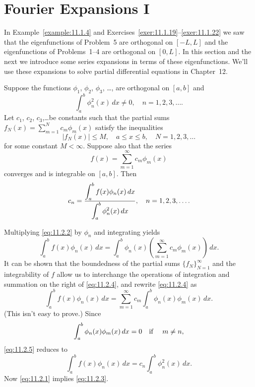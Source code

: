\section{Fourier Expansions I}

\noindent
In Example~\ref{example:11.1.4} and
Exercises~\ref{exer:11.1.19}--\ref{exer:11.1.22} we saw that
the eigenfunctions of Problem~5 are orthogonal on $[-L,L]$ and the eigenfunctions of Problems~1--4
are orthogonal on $[0,L]$. In this section and the next we introduce some series expansions in terms
of these eigenfunctions. We'll use these expansions to solve partial differential equations in
Chapter~12.

\begin{theorem}
  \color{blue}
  \label{thmtype:11.2.1} Suppose the functions $\phi_{1}$, $\phi_{2}$, $\phi_{3}$, \dots, are
  orthogonal on $[a,b]$ and
  \begin{equation}
    \label{eq:11.2.1}\int_{a}^{b}\phi_{n}^{2}(x)\,dx\ne0,\quad n=1,2,3,\dots.
  \end{equation}
  Let $c_{1}$, $c_{2}$, $c_{3}$,\dots be constants such that the partial sums
  $f_{N}(x)=\sum_{m=1}^{N}c_{m}\phi_{m}(x)$ satisfy the inequalities
  \[
    |f_{N}(x)|\le M,\quad a\le x\le b,\quad N=1,2,3,\dots
  \]
  for some constant $M<\infty$. Suppose also that the series
  \begin{equation}
    \label{eq:11.2.2}f(x)=\sum_{m=1}^{\infty}c_{m}\phi_{m}(x)
  \end{equation}
  converges and is integrable on $[a,b]$. Then
  \begin{equation}
    \label{eq:11.2.3}c_{n}=\frac{\displaystyle\int_{a}^{b}f(x)\phi_{n}(x)\,dx}{\displaystyle\int_{a}^{b}\phi_{n}^{2}(x)\,dx},\quad n=1,2,3,\dots.
  \end{equation}
\end{theorem}

\proof Multiplying \eqref{eq:11.2.2} by $\phi_{n}$ and integrating yields
\begin{equation}
  \label{eq:11.2.4}\int_{a}^{b}f(x)\phi_{n}(x)\,dx=\int_{a}^{b}\phi_{n}(x)\left(\sum_{m=1}^{\infty}c_{m}\phi_{m}(x)\right)\,dx.
\end{equation}
It can be shown that the boundedness of the partial sums $\{f_{N}\}_{N=1}^{\infty}$ and the
integrability of $f$ allow us to interchange the operations of integration and summation on the
right of \eqref{eq:11.2.4}, and rewrite \eqref{eq:11.2.4} as
\begin{equation}
  \label{eq:11.2.5}\int_{a}^{b}f(x)\phi_{n}(x)\,dx=\sum_{m=1}^{\infty}c_{m}\int_{a}^{b}\phi_{n}(x)\phi_{m}(x)\,dx.
\end{equation}
(This isn't easy to prove.) Since
\[
  \int_{a}^{b}\phi_{n}(x)\phi_{m}(x)\,dx=0\mbox{\quad if \quad}m\ne n,
\]
\eqref{eq:11.2.5} reduces to
\[
  \int_{a}^{b}f(x)\phi_{n}(x)\,dx=c_{n}\int_{a}^{b}\phi_{n}^{2}(x)\,dx.
\]
Now \eqref{eq:11.2.1} implies \eqref{eq:11.2.3}.\bbox

